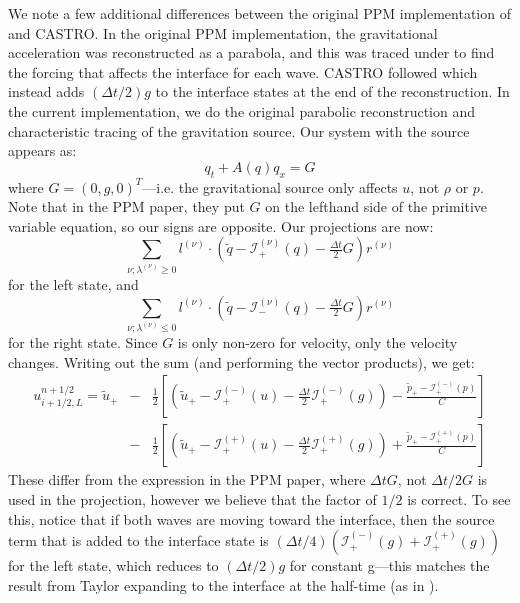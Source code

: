 \documentclass[iop]{emulateapj}
\newcommand{\evm}{{(-)}}
\newcommand{\evp}{{(+)}}
\newcommand{\enu}{{(\nu)}}
\begin{document}
We note a few additional differences between the original PPM
implementation of \citet{ppm} and CASTRO.  In the original PPM
implementation, the gravitational acceleration was reconstructed as a parabola, and
this was traced under to find the forcing that affects the interface
for each wave.  CASTRO followed \citet{ppmunsplit} which instead adds
$(\Delta t/2)g$ to the interface states at the end of the
reconstruction.  In the current implementation, we do the original
parabolic reconstruction and characteristic tracing of the gravitation
source.  Our system with the source appears as:
\begin{equation}
q_t + A(q) q_x = G
\end{equation}
where $G = (0, g, 0)^T$---i.e. the gravitational source only affects
$u$, not $\rho$ or $p$.  Note that in the PPM paper, they put $G$ on 
the lefthand side of the primitive variable equation, so our signs are
opposite.  Our projections are now:
\begin{equation}
\sum_{\nu; \lambda^\enu \ge 0}l^\enu \cdot (\tilde{q} - \mathcal{I}^\enu_+(q) - \tfrac{\Delta t}{2} G) r^\enu
\end{equation}
for the left state, and
\begin{equation}
\sum_{\nu; \lambda^\enu \le 0} l^\enu \cdot (\tilde{q} - \mathcal{I}^\enu_-(q) - \tfrac{\Delta t}{2} G) r^\enu 
\end{equation}
for the right state.  Since $G$ is only non-zero for velocity, only
the velocity changes.  Writing out the sum (and performing the vector products), we
get:
\begin{eqnarray}
u_{i+1/2,L}^{n+1/2} =
   \tilde{u}_+ 
  &-& \frac{1}{2} \left [
      \left (\tilde{u}_+ - \mathcal{I}_+^\evm(u) - \frac{\Delta t}{2} \mathcal{I}^\evm_+(g) \right ) - 
       \frac{\tilde{p}_+ - \mathcal{I}_+^\evm(p)}{C} \right ] \nonumber \\
  &-& \frac{1}{2} \left [
      \left (\tilde{u}_+ - \mathcal{I}_+^\evp(u) - \frac{\Delta t}{2} \mathcal{I}^\evp_+(g) \right ) +
       \frac{\tilde{p}_+ - \mathcal{I}_+^\evp(p)}{C} \right ]
\end{eqnarray}
These differ from the expression in the PPM paper, where $\Delta t G$,
not $\Delta t/2 G$ is used in the projection, however we believe that
the factor of $1/2$ is correct.  To see this, notice that if both
waves are moving toward the interface, then the source term that is
added to the interface state is $(\Delta t/4) (\mathcal{I}_+^\evm(g) +
\mathcal{I}_+^\evp(g))$ for the left state, which reduces to $(\Delta
t/2) g$ for constant g---this matches the result from Taylor
expanding to the interface at the half-time (as in \citealt{ppmunsplit}).
\end{document}
